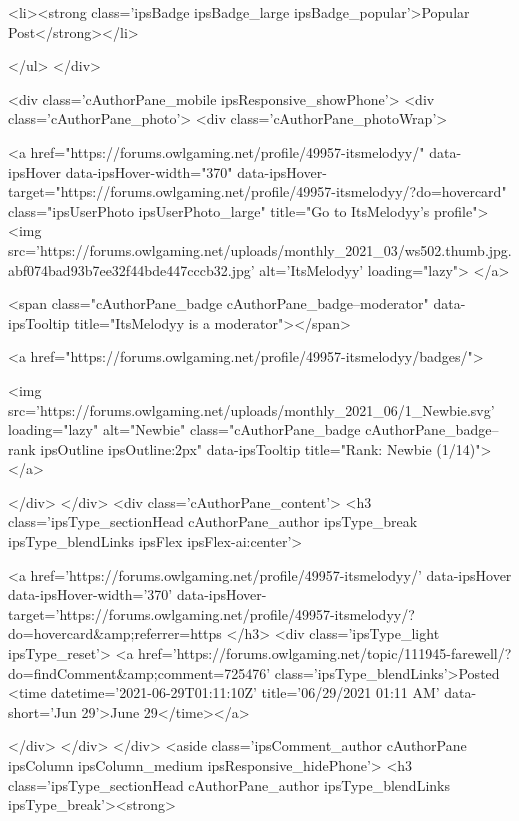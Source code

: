 				
				
				
					<li><strong class='ipsBadge ipsBadge_large ipsBadge_popular'>Popular Post</strong></li>
				
			</ul>
		</div>
	

	<div class='cAuthorPane_mobile ipsResponsive_showPhone'>
		<div class='cAuthorPane_photo'>
			<div class='cAuthorPane_photoWrap'>
				


	<a href="https://forums.owlgaming.net/profile/49957-itsmelodyy/" data-ipsHover data-ipsHover-width="370" data-ipsHover-target="https://forums.owlgaming.net/profile/49957-itsmelodyy/?do=hovercard" class="ipsUserPhoto ipsUserPhoto_large" title="Go to ItsMelodyy's profile">
		<img src='https://forums.owlgaming.net/uploads/monthly_2021_03/ws502.thumb.jpg.abf074bad93b7ee32f44bde447cccb32.jpg' alt='ItsMelodyy' loading="lazy">
	</a>

				
				<span class="cAuthorPane_badge cAuthorPane_badge--moderator" data-ipsTooltip title="ItsMelodyy is a moderator"></span>
				
				
					<a href="https://forums.owlgaming.net/profile/49957-itsmelodyy/badges/">
						
<img src='https://forums.owlgaming.net/uploads/monthly_2021_06/1_Newbie.svg' loading="lazy" alt="Newbie" class="cAuthorPane_badge cAuthorPane_badge--rank ipsOutline ipsOutline:2px" data-ipsTooltip title="Rank: Newbie (1/14)">
					</a>
				
			</div>
		</div>
		<div class='cAuthorPane_content'>
			<h3 class='ipsType_sectionHead cAuthorPane_author ipsType_break ipsType_blendLinks ipsFlex ipsFlex-ai:center'>
				


<a href='https://forums.owlgaming.net/profile/49957-itsmelodyy/' data-ipsHover data-ipsHover-width='370' data-ipsHover-target='https://forums.owlgaming.net/profile/49957-itsmelodyy/?do=hovercard&amp;referrer=https%
			</h3>
			<div class='ipsType_light ipsType_reset'>
				<a href='https://forums.owlgaming.net/topic/111945-farewell/?do=findComment&amp;comment=725476' class='ipsType_blendLinks'>Posted <time datetime='2021-06-29T01:11:10Z' title='06/29/2021 01:11  AM' data-short='Jun 29'>June 29</time></a>
				
			</div>
		</div>
	</div>
	<aside class='ipsComment_author cAuthorPane ipsColumn ipsColumn_medium ipsResponsive_hidePhone'>
		<h3 class='ipsType_sectionHead cAuthorPane_author ipsType_blendLinks ipsType_break'><strong>


